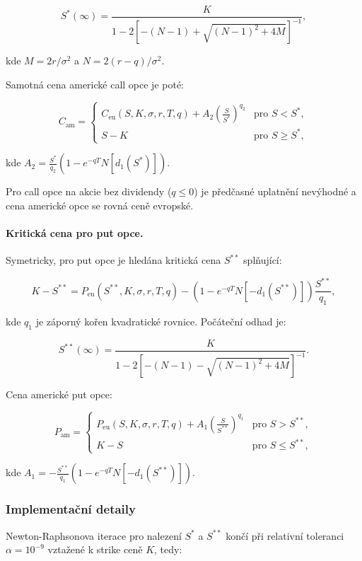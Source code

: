 \[
S^*(\infty) = \frac{K}{1 - 2\left[-(N-1) + \sqrt{(N-1)^2 + 4M}\right]^{-1}},
\]

kde \(M = 2r / \sigma^2\) a \(N = 2(r - q) / \sigma^2\).

Samotná cena americké call opce je poté:

\[
C_{\text{am}} =
\begin{cases}
C_{\text{eu}}(S, K, \sigma, r, T, q) + A_2 \left(\frac{S}{S^*}\right)^{q_2} & \text{pro } S < S^*, \\[2pt]
S - K & \text{pro } S \ge S^*,
\end{cases}
\]

kde \(A_2 = \frac{S^*}{q_2} \left(1 - e^{-qT} N[d_1(S^*)]\right)\).

Pro call opce na akcie bez dividendy (\(q \le 0\)) je předčasné uplatnění nevýhodné a cena americké opce se rovná ceně evropské.

\paragraph{Kritická cena pro put opce.} Symetricky, pro put opce je hledána kritická cena \(S^{**}\) splňující:

\[
K - S^{**} = P_{\text{eu}}(S^{**}, K, \sigma, r, T, q) - \left(1 - e^{-qT} N[-d_1(S^{**})]\right) \frac{S^{**}}{q_1},
\]

kde \(q_1\) je záporný kořen kvadratické rovnice. Počáteční odhad je:

\[
S^{**}(\infty) = \frac{K}{1 - 2\left[-(N-1) - \sqrt{(N-1)^2 + 4M}\right]^{-1}}.
\]

Cena americké put opce:

\[
P_{\text{am}} =
\begin{cases}
P_{\text{eu}}(S, K, \sigma, r, T, q) + A_1 \left(\frac{S}{S^{**}}\right)^{q_1} & \text{pro } S > S^{**}, \\[2pt]
K - S & \text{pro } S \le S^{**},
\end{cases}
\]

kde \(A_1 = -\frac{S^{**}}{q_1} \left(1 - e^{-qT} N[-d_1(S^{**})]\right)\).

\subsubsection{Implementační detaily}

Newton-Raphsonova iterace pro nalezení \(S^*\) a \(S^{**}\) končí při relativní toleranci \(\alpha = 10^{-9}\) vztažené k strike ceně \(K\), tedy:

